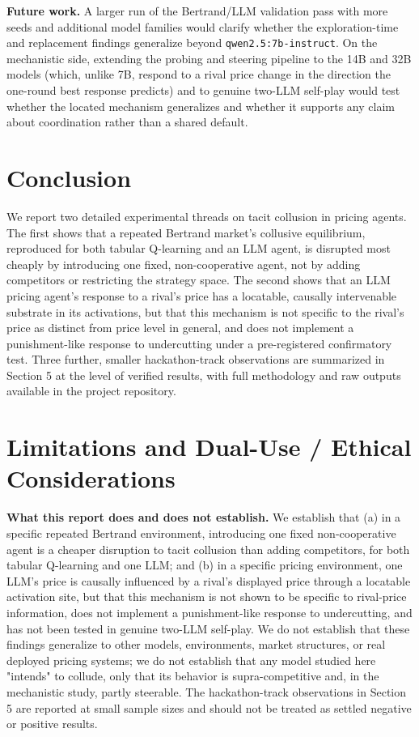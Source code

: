 \documentclass[11pt]{article}
\begin{document}
\textbf{Future work.} A larger run of the Bertrand/LLM validation pass with more seeds and additional model families would clarify whether the exploration-time and replacement findings generalize beyond \texttt{qwen2.5:7b-instruct}. On the mechanistic side, extending the probing and steering pipeline to the 14B and 32B models (which, unlike 7B, respond to a rival price change in the direction the one-round best response predicts) and to genuine two-LLM self-play would test whether the located mechanism generalizes and whether it supports any claim about coordination rather than a shared default.

\section{Conclusion}

We report two detailed experimental threads on tacit collusion in pricing agents. The first shows that a repeated Bertrand market's collusive equilibrium, reproduced for both tabular Q-learning and an LLM agent, is disrupted most cheaply by introducing one fixed, non-cooperative agent, not by adding competitors or restricting the strategy space. The second shows that an LLM pricing agent's response to a rival's price has a locatable, causally intervenable substrate in its activations, but that this mechanism is not specific to the rival's price as distinct from price level in general, and does not implement a punishment-like response to undercutting under a pre-registered confirmatory test. Three further, smaller hackathon-track observations are summarized in Section 5 at the level of verified results, with full methodology and raw outputs available in the project repository.

\section*{Limitations and Dual-Use / Ethical Considerations}
\textbf{What this report does and does not establish.} We establish that (a) in a specific repeated Bertrand environment, introducing one fixed non-cooperative agent is a cheaper disruption to tacit collusion than adding competitors, for both tabular Q-learning and one LLM; and (b) in a specific pricing environment, one LLM's price is causally influenced by a rival's displayed price through a locatable activation site, but that this mechanism is not shown to be specific to rival-price information, does not implement a punishment-like response to undercutting, and has not been tested in genuine two-LLM self-play. We do not establish that these findings generalize to other models, environments, market structures, or real deployed pricing systems; we do not establish that any model studied here "intends" to collude, only that its behavior is supra-competitive and, in the mechanistic study, partly steerable. The hackathon-track observations in Section 5 are reported at small sample sizes and should not be treated as settled negative or positive results.
\end{document}
